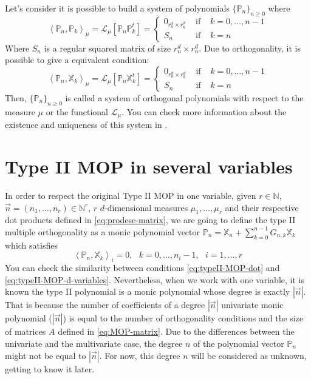 \documentclass[12pt,a4]{article}
\theoremstyle{plain}
\newcommand{\N}[0]{\mathbb{N}}
\newcommand{\prodesc}[2]{\left\langle #1 , #2 \right\rangle}
\begin{document}
Let's consider it is possible to build a system of polynomials $\{\mathbb{P}_n\}_{n\geq 0}$ where
$$
\prodesc{\mathbb P_n}{\mathbb P_k}_\mu = \mathcal{L}_\mu[\mathbb P_n \mathbb P_k^t]= \left\{\begin{array}{ccl}
    0_{r_n^d\times r_k^d} &   \text{ if } & k=0,\dots,n-1 \\
    S_n & \text{ if } & k=n      
\end{array}\right. 
$$
Where $S_n$ is a regular squared matrix of size $r_n^d\times r_n^d$.
Due to orthogonality, it is possible to give a equivalent condition:
\begin{equation}
    \label{eq:prodesc-matrix-PX}
    \prodesc{\mathbb P_n}{\mathbb X_k}_\mu = \mathcal{L}_\mu[\mathbb P_n \mathbb X_k^t]= \left\{\begin{array}{ccl}
        0_{r_n^d\times r_k^d} &   \text{ if } & k=0,\dots,n-1 \\
        S_n & \text{ if } & k=n      
    \end{array}\right. 
\end{equation}
Then, $\{\mathbb{P}_n\}_{n\geq 0}$ is called a system of orthogonal polynomials with respect to the measure $\mu$ or the functional $\mathcal L_\mu$. You can check more information about the existence and uniqueness of this system in \cite[Ch. III, Section 3.2]{dunkl_xu_2014}.

\section{Type II MOP in several variables}

In order to respect the original Type II MOP in one variable, given $r\in\N$, $\vec n = (n_1,\dots, n_r)\in\N^r$, $r$ $d$-dimensional measures $\mu_1, \dots, \mu_r$ and their respective dot products defined in \eqref{eq:prodesc-matrix}, we are going to define the type II multiple orthogonality as a monic polynomial vector $\mathbb P_n = \mathbb X_n + \displaystyle\sum_{k=0}^{n-1}G_{n,k} \mathbb X_k$ which satisfies
\begin{equation}
    \label{eq:typeII-MOP-d-variables}
    \prodesc{\mathbb P_n}{\mathbb X_k}_i = 0, \ \ \ k=0,\dots,n_i-1, \ \ \ i=1,\dots,r
\end{equation}
You can check the similarity between conditions \eqref{eq:typeII-MOP-dot} and \eqref{eq:typeII-MOP-d-variables}. Nevertheless, when we work with one variable, it is known the type II polynomial is a monic polynomial whose degree is exactly $|\vec n|$. That is because the number of coefficients of a degree $|\vec n|$ univariate monic polynomial ($|\vec n|$) is equal to the number of orthogonality conditions and the size of matrices $A$ defined in \eqref{eq:MOP-matrix}. Due to the differences between the univariate and the multivariate case, the degree $n$ of the polynomial vector $\mathbb P_n$ might not be equal to $|\vec n|$. For now, this degree $n$ will be considered as unknown, getting to know it later.
\end{document}
